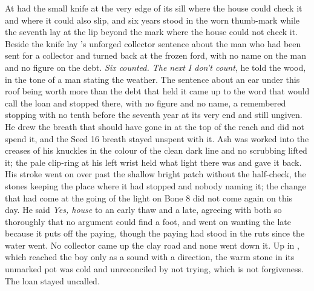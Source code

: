 \scenebreak

At   had the small knife at the very edge of its sill where the house could check it and where it could also slip, and six years stood in the worn thumb-mark while the seventh lay at the lip beyond the mark where the house could not check it. Beside the knife lay 's unforged collector sentence about the man who had been sent for a collector and turned back at the frozen ford, with no name on the man and no figure on the debt. \emph{Six counted. The next I don't count}, he told the wood, in the tone of a man stating the weather. The sentence about an ear under this roof being worth more than the debt that held it came up to the word that would call the loan and stopped there, with no figure and no name, a remembered stopping with no tenth before the seventh year at its very end and still ungiven. He drew the breath that should have gone in at the top of the reach and did not spend it, and the Seed 16 breath stayed unspent with it. Ash was worked into the creases of his knuckles in the colour of the clean dark line and no scrubbing lifted it; the pale clip-ring at his left wrist held what light there was and gave it back. His stroke went on over  past the shallow bright patch without the half-check, the stones keeping the place where it had stopped and nobody naming it; the change that had come at the going of the light on Bone 8 did not come again on this day. He said \emph{Yes, house} to an early thaw and a late, agreeing with both so thoroughly that no argument could find a foot, and went on wanting the late because it puts off the paying, though the paying had stood in the ruts since the water went. No collector came up the clay road and none went down it. Up in , which reached the boy only as a sound with a direction, the warm stone in its unmarked pot was cold and unreconciled by not trying, which is not forgiveness. The loan stayed uncalled.

